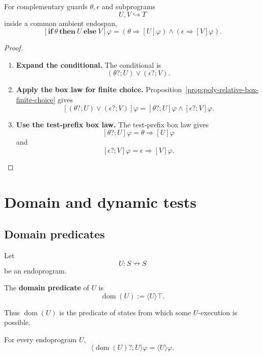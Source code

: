 \begin{proposition}
\label{prop:poly-relative-conditional-box-law}
For complementary guards \(\theta,\epsilon\) and subprograms
\[
U,V\hookrightarrow T
\]
inside a common ambient endospan,
\[
\left[
\mathbf{if}\ \theta\ \mathbf{then}\ U\ \mathbf{else}\ V
\right]\varphi
=
(\theta\Rightarrow[U]\varphi)
\wedge
(\epsilon\Rightarrow[V]\varphi).
\]
\end{proposition}

\begin{proof}
\leavevmode
\begin{enumerate}
\item \textbf{Expand the conditional.}
The conditional is
\[
(\theta?;U)\vee(\epsilon?;V).
\]

\item \textbf{Apply the box law for finite choice.}
Proposition~\ref{prop:poly-relative-box-finite-choice} gives
\[
[(\theta?;U)\vee(\epsilon?;V)]\varphi
=
[\theta?;U]\varphi\wedge[\epsilon?;V]\varphi.
\]

\item \textbf{Use the test-prefix box law.}
The test-prefix box law gives
\[
[\theta?;U]\varphi=\theta\Rightarrow[U]\varphi
\]
and
\[
[\epsilon?;V]\varphi=\epsilon\Rightarrow[V]\varphi.
\]
\end{enumerate}
\end{proof}

\section{Domain and dynamic tests}
\label{sec:poly-relative-domain-tests}

\subsection{Domain predicates}
\label{subsec:poly-relative-domain-predicate}

Let
\[
U:S\nrightarrow S
\]
be an endoprogram.

\begin{definition}
\label{def:poly-relative-domain}
The \textbf{domain predicate} of \(U\) is
\[
\operatorname{dom}(U):=\langle U\rangle\top.
\]
\end{definition}

Thus \(\operatorname{dom}(U)\) is the predicate of states from which some
\(U\)-execution is possible.

\begin{proposition}
\label{prop:poly-relative-domain-prefix}
For every endoprogram \(U\),
\[
\langle \operatorname{dom}(U)?;U\rangle\varphi
=
\langle U\rangle\varphi.
\]
\end{proposition}

